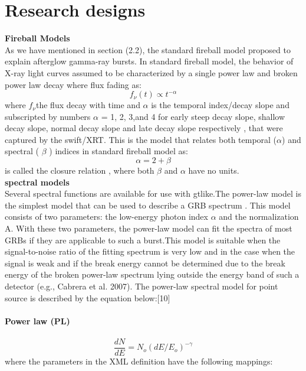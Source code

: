 \section{Research designs}
\textbf{Fireball Models}\\
As we have mentioned in section (2.2), the  standard fireball model proposed to explain afterglow gamma-ray bursts. In standard fireball model, the behavior of X-ray light curves  assumed to be characterized by a single power law  and broken power law decay where flux fading  as: 
\begin{equation}
f_{\nu}(t)\propto  t^{-\alpha} 
\end{equation}
where  $f_{\nu} $the flux decay with time and  $ \alpha  $ is the temporal index/decay slope and subscripted by numbers  $ \alpha $ = 1, 2, 3,and 4 for early steep decay slope, shallow decay slope, normal decay slope and late decay slope respectively , that were captured by the swift/XRT. This  is the model that relates both temporal ($ \alpha $) and spectral ( $ \beta $ ) indices  in standard fireball model as:
\begin{equation}
 \alpha  = 2 +   \beta   
\end{equation}
 is  called the closure relation , where   both  $\beta $  and  $ \alpha $  have  no  units.\\
 \textbf{spectral models}\\
 Several spectral functions are available for use with gtlike.The power-law model is the simplest model that can be used to describe a GRB spectrum . This model consists of two parameters: the low-energy photon index $ \alpha $ and the normalization A. With these two parameters, the power-law model can fit the spectra of most GRBs if they are applicable to such a burst.This model is suitable when the signal-to-noise ratio of the fitting spectrum is very low and in the case when the signal is weak and if the break energy cannot be determined due to the break energy of the broken power-law spectrum lying outside the energy band of such a detector (e.g., Cabrera et al. 2007). The power-law spectral model for point source is described by the equation below:[10]\\\\ 
\textbf{ Power law (PL) }\\\\
\begin{equation}
\frac{dN}{dE} = N_{o} (dE/ E_{o})^{-\gamma}
\end{equation}
where the parameters in the XML definition have the following mappings:\\
